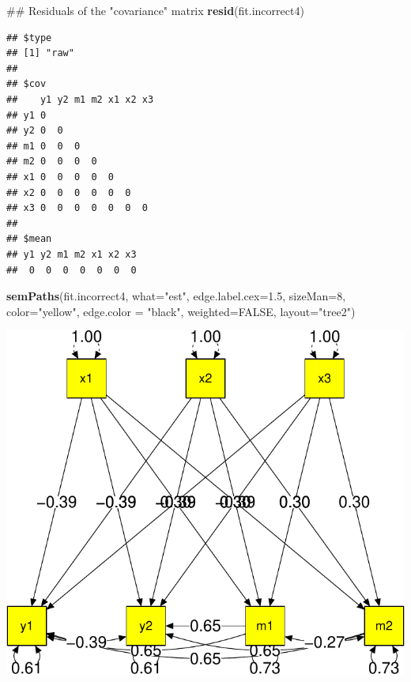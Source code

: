 \documentclass[]{article}
\newenvironment{Shaded}{\begin{snugshade}}{\end{snugshade}}
\newcommand{\KeywordTok}[1]{\textcolor[rgb]{0.13,0.29,0.53}{\textbf{#1}}}
\newcommand{\DataTypeTok}[1]{\textcolor[rgb]{0.13,0.29,0.53}{#1}}
\newcommand{\DecValTok}[1]{\textcolor[rgb]{0.00,0.00,0.81}{#1}}
\newcommand{\FloatTok}[1]{\textcolor[rgb]{0.00,0.00,0.81}{#1}}
\newcommand{\StringTok}[1]{\textcolor[rgb]{0.31,0.60,0.02}{#1}}
\newcommand{\OtherTok}[1]{\textcolor[rgb]{0.56,0.35,0.01}{#1}}
\newcommand{\NormalTok}[1]{#1}
\begin{document}
\begin{Shaded}
\begin{Highlighting}[]
\NormalTok{## Residuals of the "covariance" matrix}
\KeywordTok{resid}\NormalTok{(fit.incorrect4)}
\end{Highlighting}
\end{Shaded}

\begin{verbatim}
## $type
## [1] "raw"
## 
## $cov
##    y1 y2 m1 m2 x1 x2 x3
## y1 0                   
## y2 0  0                
## m1 0  0  0             
## m2 0  0  0  0          
## x1 0  0  0  0  0       
## x2 0  0  0  0  0  0    
## x3 0  0  0  0  0  0  0 
## 
## $mean
## y1 y2 m1 m2 x1 x2 x3 
##  0  0  0  0  0  0  0
\end{verbatim}

\begin{Shaded}
\begin{Highlighting}[]
\KeywordTok{semPaths}\NormalTok{(fit.incorrect4, }\DataTypeTok{what=}\StringTok{"est"}\NormalTok{, }\DataTypeTok{edge.label.cex=}\FloatTok{1.5}\NormalTok{, }
         \DataTypeTok{sizeMan=}\DecValTok{8}\NormalTok{, }\DataTypeTok{color=}\StringTok{"yellow"}\NormalTok{, }\DataTypeTok{edge.color =} \StringTok{"black"}\NormalTok{, }
         \DataTypeTok{weighted=}\OtherTok{FALSE}\NormalTok{, }\DataTypeTok{layout=}\StringTok{"tree2"}\NormalTok{)}
\end{Highlighting}
\end{Shaded}

\includegraphics{Supplemental_materials_3_files/figure-latex/unnamed-chunk-9-1.pdf}
\end{document}
